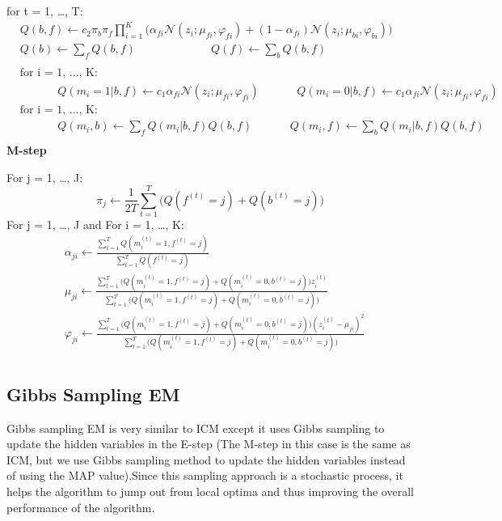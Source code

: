 \documentclass{article} %
\begin{document}
for t = 1, \ldots , T: 
\begin{align*} 
&Q(b,f) \leftarrow c_2\pi_b\pi_f\prod_{i=1}^K\Bigg(\alpha_{fi}\mathcal{N}(z_i;\mu_{fi},\varphi_{fi})+ (1-\alpha_{fi})\mathcal{N}(z_i;\mu_{bi},\varphi_{bi}) \Bigg) \\
&Q(b) \leftarrow \sum_{f} Q(b,f) \text{ }\text{ }\text{ }\text{ }\text{ }\text{ }\text{ }\text{ }\text{ }\text{ }Q(f) \leftarrow \sum_{b} Q(b,f) \\\\
&\text{for i = 1, \ldots , K: } \\
&\text{ }\text{ }\text{ }\text{ }\text{ }Q(m_i = 1|b,f) \leftarrow c_1\alpha_{fi}\mathcal{N}(z_i;\mu_{fi},\varphi_{fi})\text{ }\text{ }\text{ }\text{ }\text{ }Q(m_i = 0|b,f) \leftarrow c_1\alpha_{fi}\mathcal{N}(z_i;\mu_{fi},\varphi_{fi})\\
&\text{for i = 1, \ldots , K: } \\
&\text{ }\text{ }\text{ }\text{ }\text{ }Q(m_i,b) \leftarrow \sum_{f}Q(m_i|b,f) Q(b,f)\text{ }\text{ }\text{ }\text{ }\text{ }Q(m_i,f) \leftarrow \sum_{b}Q(m_i|b,f) Q(b,f)\\
\end{align*} 
\textbf{M-step}

For j = 1, \ldots , J: 
\begin{equation*}
\pi_j \leftarrow \frac{1}{2T}\sum_{t=1}^T\Bigg(Q(f^{(t)} = j) + Q(b^{(t)} = j)\Bigg)
\end{equation*}
For j = 1, \ldots , J and For i = 1, \ldots , K: 
\begin{align*} 
&\alpha_{ji} \leftarrow \frac{\sum_{t=1}^T Q(m_i^{(t)}=1,f^{(t)} = j)}{\sum_{t=1}^TQ(f^{(t)} = j)} \\
&\mu_{ji} \leftarrow \frac{\sum_{t=1}^T\Big(Q(m_i^{(t)}=1,f^{(t)} = j) + Q(m_i^{(t)}=0,b^{(t)} = j)\Big)z_i^{(t)}}{\sum_{t=1}^T \Big(Q(m_i^{(t)}=1,f^{(t)} = j) + Q(m_i^{(t)}=0,b^{(t)} = j)\Big)} \\
&\varphi_{ji} \leftarrow \frac{\sum_{t=1}^T\Big(Q(m_i^{(t)}=1,f^{(t)} = j) + Q(m_i^{(t)}=0,b^{(t)} = j)\Big)(z_i^{(t)}-\mu_{ji})^2}{\sum_{t=1}^T \Big(Q(m_i^{(t)}=1,f^{(t)} = j) + Q(m_i^{(t)}=0,b^{(t)} = j)\Big)} \\
\end{align*} 
\subsection{Gibbs Sampling EM}
\label{gibbs_em}
Gibbs sampling EM is very similar to ICM except it uses Gibbs sampling to update the hidden variables in the E-step (The M-step in this case is the same as ICM, but we use Gibbs sampling method to update the hidden variables instead of  using the MAP value).Since this sampling approach is a stochastic process, it helps the algorithm to jump out from local optima and thus improving the overall performance of the algorithm.
\end{document}
